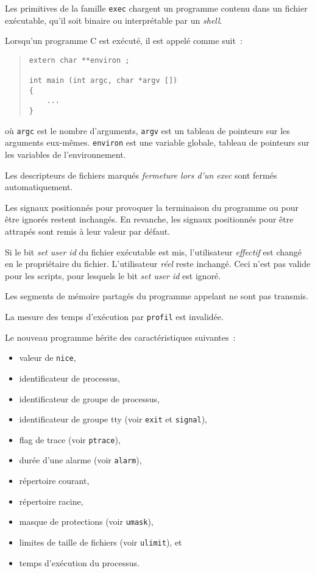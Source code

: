 \documentclass [twoside] {report}
\begin{document}
Les primitives de la famille {\tt exec} chargent un
programme contenu dans un fichier exécutable,
qu'il soit binaire ou interprétable par un
{\em shell}.

Lorsqu'un programme C est exécuté, il est appelé
comme suit~:

\begin {quote}
\begin {verbatim}
extern char **environ ;

int main (int argc, char *argv [])
{
    ...
}
\end{verbatim}
\end {quote}

où {\tt argc} est le nombre d'arguments, {\tt argv}
est un tableau de pointeurs sur les arguments
eux-mêmes. {\tt environ} est une variable globale,
tableau de pointeurs sur les variables de l'environnement.

Les descripteurs de fichiers marqués {\it fermeture
lors d'un exec} sont fermés automatiquement.

Les signaux positionnés pour provoquer la terminaison
du programme ou pour être ignorés restent
inchangés. En revanche, les signaux positionnés
pour être attrapés sont remis à leur valeur par
défaut.

Si le bit {\it set user id} du fichier exécutable
est mis, l'utilisateur {\it effectif} est changé en le
propriétaire du fichier. L'utilisateur {\it réel}
reste inchangé. Ceci n'est pas valide pour les
scripts, pour lesquels le bit {\it set user id} est
ignoré.

Les segments de mémoire partagés du programme
appelant ne sont pas transmis.

La mesure des temps d'exécution par {\tt profil} est
invalidée.

Le nouveau programme hérite des caractéristiques
suivantes~:
\begin {itemize}
    \item valeur de {\tt nice},
    \item identificateur de processus,
    \item identificateur de groupe de processus,
    \item identificateur de groupe tty (voir {\tt exit} et {\tt signal}),
    \item flag de trace (voir {\tt ptrace}),
    \item durée d'une alarme (voir {\tt alarm}),
    \item répertoire courant,
    \item répertoire racine,
    \item masque de protections (voir {\tt umask}),
    \item limites de taille de fichiers (voir {\tt ulimit}), et
    \item temps d'exécution du processus.
\end {itemize}
\end{document}
